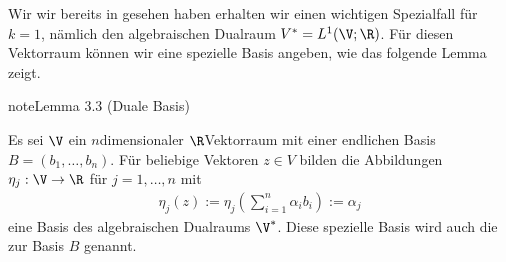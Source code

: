 \documentclass[letterpaper,10pt,english]{jupyterBook}
\begin{document}
\sphinxAtStartPar
Wir wir bereits in {\hyperref[\detokenize{vektoranalysis/multilinear:ex:multilinear}]{}} gesehen haben erhalten wir einen wichtigen Spezialfall für \(k=1\), nämlich den algebraischen Dualraum \(V^\ast = L^1(\V;\R)\).
Für diesen Vektorraum können wir eine spezielle Basis angeben, wie das folgende Lemma zeigt.
\label{vektoranalysis/multilinear:lem:dualeBasis}
\begin{sphinxadmonition}{note}{Lemma 3.3 (Duale Basis)}



\sphinxAtStartPar
Es sei \(\V\) ein \(n\)\sphinxhyphen{}dimensionaler \(\R\)\sphinxhyphen{}Vektorraum mit einer endlichen Basis \(B = (b_1,\ldots,b_n)\).
Für beliebige Vektoren \(z \in V\) bilden die Abbildungen \(\eta_j:\V\rightarrow\R\) für \(j=1,\ldots,n\) mit
\begin{equation*}
\begin{split}\eta_j(z) := \eta_j\left(\sum_{i=1}^n \alpha_i b_i\right) := \alpha_j\end{split}
\end{equation*}
\sphinxAtStartPar
eine Basis des algebraischen Dualraums \(\V^\ast\).
Diese spezielle Basis wird auch die  zur Basis \(B\) genannt.
\end{sphinxadmonition}
\end{document}
